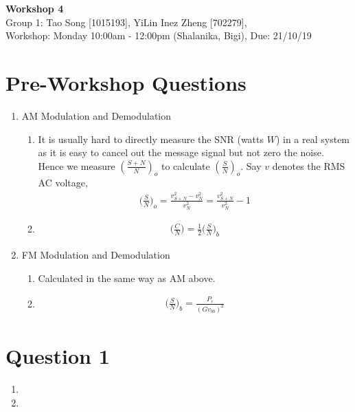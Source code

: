 \documentclass[11pt]{article}
\begin{document}
\begin{center}
\textbf{\Large{Workshop 4}}\\
Group 1: Tao Song [1015193], YiLin Inez Zheng [702279], \\
Workshop: Monday 10:00am - 12:00pm (Shalanika, Bigi), Due: 21/10/19  
\end{center}



\section*{Pre-Workshop Questions}
\begin{enumerate}
\item AM Modulation and Demodulation
\begin{enumerate}
    \item %
    It is usually hard to directly measure the SNR (watts $W$) in a real system as it is easy to cancel out the message signal but not zero the noise. Hence we measure $(\frac{S + N}{N})_o$ to calculate $(\frac{S}{N})_o$. Say $v$ denotes the RMS AC voltage, 
    \begin{align*}
        \bigg(\frac{S}{N}\bigg)_o = \frac{v_{S+N}^2 - v_{N}^2}{v_{N}^2} = \frac{v_{S+N}^2}{v_{N}^2} - 1
    \end{align*}
    \item %
    \begin{align*}
    \bigg(\frac{C}{N}\bigg) = \frac{1}{2} \bigg( \frac{S}{N} \bigg)_b
    \end{align*}
\end{enumerate}

\item FM Modulation and Demodulation
\begin{enumerate}
    \item %
    Calculated in the same way as AM above. 
    \item %
    \begin{align*}
        \bigg(\frac{S}{N}\bigg)_b = \frac{P_r}{(G v_{bb})^2}
    \end{align*}
    
\end{enumerate}
\end{enumerate}

\section*{Question 1}
\begin{enumerate}[label=(\alph*)]
\item %

\item %

\end{enumerate}
\end{document}
